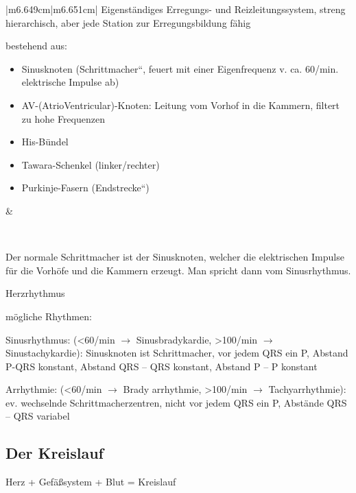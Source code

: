 \documentclass{article}
\begin{document}
\begin{center}
\tablehead{}\begin{supertabular}{|m{6.649cm}|m{6.651cm}|}
\hline
Eigenst\"andiges  Erregungs- und  Reizleitungssystem, streng
hierarchisch, aber jede  Station zur Erregungsbildung  f\"ahig 

bestehend aus:

\begin{itemize}
\item Sinusknoten  ({\quotedblbase}Schrittmacher{\textquotedblleft},
feuert mit einer Eigenfrequenz v. ca. 60/min. elektrische Impulse ab)

\item AV-(AtrioVentricular)-Knoten: Leitung vom Vorhof in die Kammern,
filtert zu hohe Frequenzen

\item His-B\"undel

\item Tawara-Schenkel (linker/rechter)

\item Purkinje-Fasern ({\quotedblbase}Endstrecke{\textquotedblleft})

\end{itemize}
 &
 \par

\\\hline
\end{supertabular}
\end{center}
Der normale Schrittmacher ist der Sinusknoten, welcher die elektrischen
Impulse f\"ur die Vorh\"ofe und die Kammern erzeugt. Man spricht dann
vom Sinusrhythmus.

Herzrhythmus

m\"ogliche Rhythmen:

Sinusrhythmus: ({\textless}60/min ${\rightarrow}$ Sinusbradykardie,
{\textgreater}100/min ${\rightarrow}$ Sinustachy\-kardie):
Sinus\-knoten ist Schrittmacher, vor jedem QRS ein P, Abstand P-QRS
konstant, Abstand QRS {}-- QRS konstant, Abstand P -- P konstant

Arrhythmie: ({\textless}60/min ${\rightarrow}$ Brady arrhythmie,
{\textgreater}100/min ${\rightarrow}$ Tachyarrhythmie): ev. wechselnde
Schrittmacherzentren, nicht vor jedem QRS ein P, Abst\"ande QRS -- QRS
variabel

\subsection{Der Kreislauf }
Herz + Gef\"a{\ss}system + Blut = Kreislauf
\end{document}
